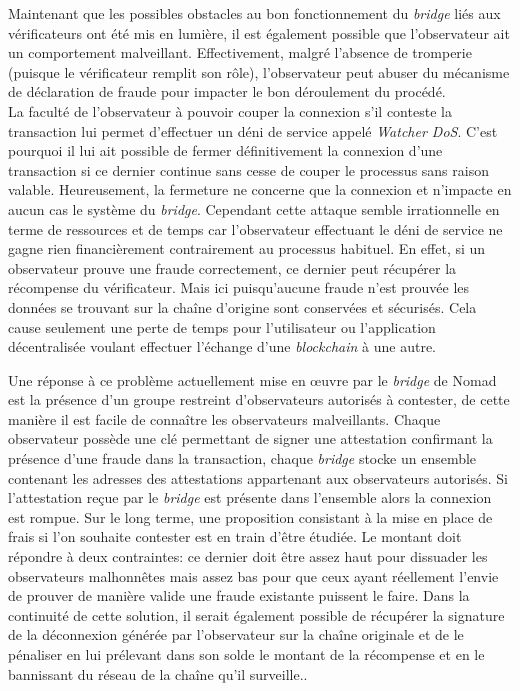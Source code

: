 Maintenant que les possibles obstacles au bon fonctionnement du \textit{bridge} liés aux \gls{vérificateur}s ont été mis en lumière, il est également possible que l’observateur ait un comportement malveillant.  Effectivement, malgré l’absence de tromperie (puisque le \gls{vérificateur} remplit son rôle), l’observateur peut abuser du mécanisme de déclaration de fraude pour impacter le bon déroulement du procédé. \\

La faculté de l’observateur à pouvoir couper la connexion s’il conteste la transaction lui permet d’effectuer un déni de service appelé \textit{Watcher DoS}. C’est pourquoi il lui ait possible de fermer définitivement la connexion d’une transaction si ce dernier continue sans cesse de couper le processus sans raison valable. Heureusement, la fermeture ne concerne que la connexion et n’impacte en aucun cas le système du \textit{bridge}. Cependant cette attaque semble irrationnelle en terme de ressources et de temps car l’observateur effectuant le déni de service ne gagne rien financièrement contrairement au processus habituel. En effet, si un observateur prouve une fraude correctement, ce dernier peut récupérer la récompense du \gls{vérificateur}. Mais ici puisqu’aucune fraude n’est prouvée les données se trouvant sur la chaîne d’origine sont conservées et sécurisés. Cela cause seulement une perte de temps pour l’utilisateur ou l’application décentralisée voulant effectuer l'échange d’une \textit{\gls{blockchain}} à une autre.

Une réponse à ce problème actuellement mise en œuvre par le \textit{bridge} de \gls{Nomad} est la présence d’un groupe restreint d’observateurs autorisés à contester, de cette manière il est facile de connaître les observateurs malveillants. Chaque observateur possède une clé permettant de signer une attestation confirmant la présence d’une fraude dans la transaction, chaque \textit{bridge} stocke un ensemble contenant les adresses des attestations appartenant aux observateurs autorisés. Si l’attestation reçue par le \textit{bridge} est présente dans l’ensemble alors la connexion est rompue\cite{NomadDocsWatcher}.
Sur le long terme, une proposition consistant à la mise en place de frais si l’on souhaite contester est en train d’être étudiée. Le montant doit répondre à deux contraintes: ce dernier doit être assez haut pour dissuader les observateurs malhonnêtes mais assez bas pour que ceux ayant réellement l’envie de prouver de manière valide une fraude existante puissent le faire. Dans la continuité de cette solution, il serait également possible de récupérer la signature de la déconnexion générée par l’observateur sur la chaîne originale et de le pénaliser en lui prélevant dans son solde le montant de la récompense et en le bannissant du réseau de la chaîne qu'il surveille.\cite{OptimisticBhuptani}.

